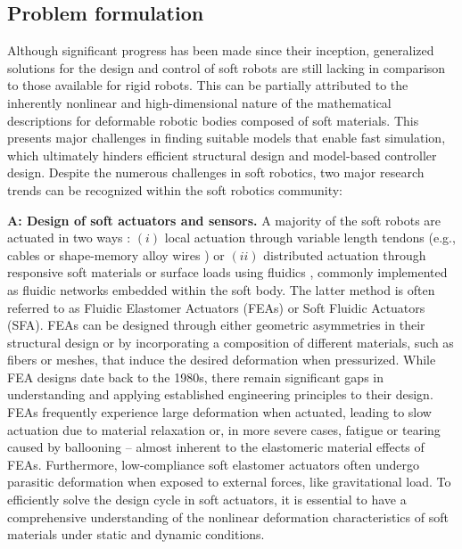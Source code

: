 \subsection{Problem formulation}
Although significant progress has been made since their inception, generalized solutions for the design and control of soft robots are still lacking in comparison to those available for rigid robots. This can be partially attributed to the inherently nonlinear and high-dimensional nature of the mathematical descriptions for deformable robotic bodies composed of soft materials. This presents major challenges in finding suitable models that enable fast simulation, which ultimately hinders efficient structural design and model-based controller design. Despite the numerous challenges in soft robotics, two major research trends can be recognized within the soft robotics community:

\textbf{A: Design of soft actuators and sensors.} A majority of the soft robots are actuated in two ways \cite{Rus2015}: $(i)$ local actuation through variable length tendons (e.g., cables \cite{Renda2018} or shape-memory alloy wires \cite{An2023Jan}) or $(ii)$ distributed actuation through responsive soft materials \cite{Vantomme2021} or surface loads using fluidics \cite{Fras2018Oct,Hawkes2017,Falkenhahn2015}, commonly implemented as fluidic networks embedded within the soft body. The latter method is often referred to as Fluidic Elastomer Actuators (FEAs) or Soft Fluidic Actuators (SFA). FEAs can be designed through either geometric asymmetries in their structural design or by incorporating a composition of different materials, such as fibers or meshes, that induce the desired deformation when pressurized. While FEA designs date back to the 1980s, there remain significant gaps in understanding and applying established engineering principles to their design. FEAs frequently experience large deformation when actuated, leading to slow actuation due to material relaxation or, in more severe cases, fatigue or tearing caused by ballooning \cite{Marchese2015} -- almost inherent to the elastomeric material effects of FEAs. Furthermore, low-compliance soft elastomer actuators often undergo parasitic deformation when exposed to external forces, like gravitational load. To efficiently solve the design cycle in soft actuators, it is essential to have a comprehensive understanding of the nonlinear deformation characteristics of soft materials under static and dynamic conditions.

